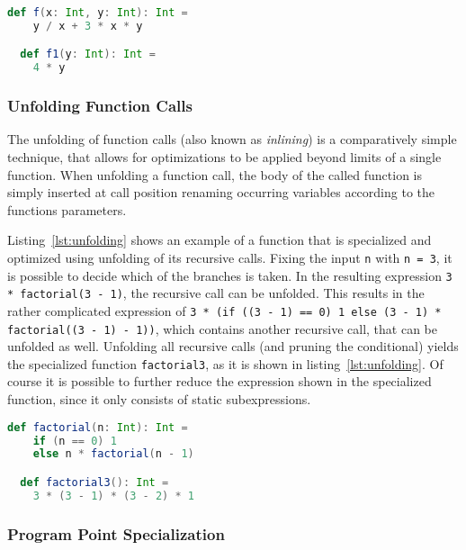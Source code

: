 \begin{lstlisting}[language=scala,caption={Definition of a simple function and its specialization.},label={lst:symbolic-computation}]
  def f(x: Int, y: Int): Int =
    y / x + 3 * x * y

  def f1(y: Int): Int =
    4 * y
\end{lstlisting}


\subsubsection*{Unfolding Function Calls}

The unfolding of function calls (also known as \textit{inlining}) is a comparatively simple technique, that allows for optimizations to be applied beyond limits of a single function.
When unfolding a function call, the body of the called function is simply inserted at call position renaming occurring variables according to the functions parameters.

Listing~\ref{lst:unfolding} shows an example of a function that is specialized and optimized using unfolding of its recursive calls.
Fixing the input \texttt{n} with \texttt{n = 3}, it is possible to decide which of the branches is taken. In the resulting expression \texttt{3 * factorial(3 - 1)}, the recursive call can be unfolded.
This results in the rather complicated expression of \linebreak \texttt{3 * (if ((3 - 1) == 0) 1 else (3 - 1) * factorial((3 - 1) - 1))}, which contains another recursive call, that can be unfolded as well.
Unfolding all recursive calls (and pruning the conditional) yields the specialized function \texttt{factorial3}, as it is shown in listing~\ref{lst:unfolding}.
Of course it is possible to further reduce the expression shown in the specialized function, since it only consists of static subexpressions.

\begin{lstlisting}[language=scala,caption={Definition of the \texttt{factorial} function and its specialization.},label={lst:unfolding}]
  def factorial(n: Int): Int =
    if (n == 0) 1
    else n * factorial(n - 1)

  def factorial3(): Int =
    3 * (3 - 1) * (3 - 2) * 1
\end{lstlisting}


\subsubsection*{Program Point Specialization}

